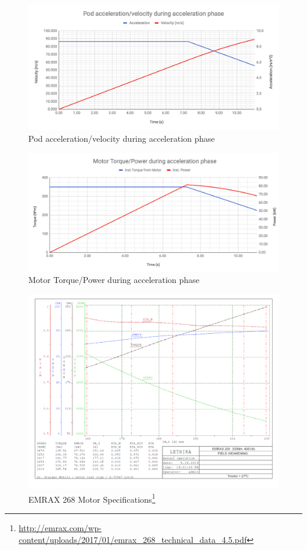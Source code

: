 \documentclass[main.tex]{subfiles}
\begin{document}
    \begin{figure}[H]
        \centering
        \includegraphics[width=\linewidth]{images/pod_acceleration_velocity_vs_time_curve}
        \caption{Pod acceleration/velocity during acceleration phase}
    \end{figure}
    \begin{figure}[H]
        \centering
        \includegraphics[width=\linewidth]{images/torque_power_vs_time_curve}
        \caption{Motor Torque/Power during acceleration phase}
    \end{figure}
    \begin{figure}[H]
        \centering
        \includegraphics[width=\linewidth]{images/fig11}
        \caption{EMRAX 268 Motor Specifications\protect\footnote{\url{http://emrax.com/wp-content/uploads/2017/01/emrax_268_technical_data_4.5.pdf}}}
    \end{figure}
\end{document}
